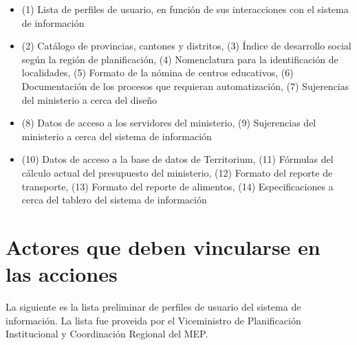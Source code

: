 \documentclass[a4paper, 9pt, conference]{article}              %
\theoremstyle{definition}
\begin{document}
\begin{itemize}
	\item (1) Lista de perfiles de usuario, en funci\'on de sus interacciones con el sistema de informaci\'on
	\item (2) Cat\'alogo de provincias, cantones y distritos, (3) \'Indice de desarrollo social seg\'un la regi\'on de planificaci\'on, (4) Nomenclatura para la identificaci\'on de localidades, (5) Formato de la n\'omina de centros educativos, (6) Documentaci\'on de los procesos que requieran automatizaci\'on, (7) Sujerencias del ministerio a cerca del dise\~no

	\item (8) Datos de acceso a los servidores del ministerio, (9) Sujerencias del ministerio a cerca del sistema de informaci\'on
	\item (10) Datos de acceso a la base de datos de Territorium, (11) F\'ormulas del c\'alculo actual del presupuesto del ministerio, (12) Formato del reporte de transporte, (13) Formato del reporte de alimentos, (14) Especificaciones a cerca del tablero del sistema de informaci\'on
\end{itemize}

\section{Actores que deben vincularse en las acciones} \label{sec:prof}

La siguiente es la lista preliminar de perfiles de usuario del sistema de informaci\'on. La lista fue proveida por el Viceministro de Planificaci\'on Institucional y Coordinaci\'on Regional del MEP.
\end{document}
